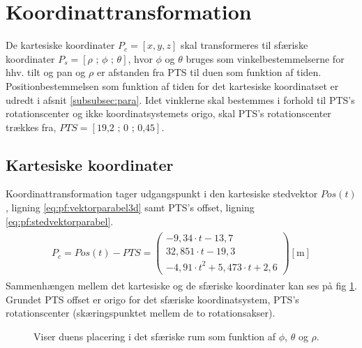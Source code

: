 \section{Koordinattransformation}
\label{sec:koordinattransformation}

De kartesiske koordinater \(P_c=[x, y, z]\) skal transformeres til sfæriske koordinater \(P_s=[\rho \text{ ; } \phi \text{ ; } \theta]\), hvor \(\phi\) og \(\theta\) bruges som vinkelbestemmelserne for hhv. tilt og pan og \(\rho\) er afstanden fra PTS til duen som funktion af tiden.
Positionbestemmelsen som funktion af tiden for det kartesiske koordinatset er udredt i afsnit \ref{subsubsec:para}.
Idet vinklerne skal bestemmes i forhold til PTS's rotationscenter og ikke koordinatsystemets origo, skal PTS's rotationscenter trækkes fra, \(PTS=[\text{19,2 ; 0 ; 0,45}]\). 

\subsection{Kartesiske koordinater}
Koordinattransformation tager udgangspunkt i den kartesiske stedvektor \(Pos(t) \), ligning \ref{eq:pf:vektorparabel3d} samt PTS's offset, ligning \ref{eq:pf:stedvektorparabel}.
\begin{align}
\begin{split}
{ P }_{ c }=Pos\left( t \right) -PTS = \left( \begin{matrix} - 9,34\cdot t-13,7 \\32,851\cdot t-19,3
\\-{ 4,91\cdot t }^{ 2 }+5,473\cdot t+2,6\end{matrix} \right) [\text{m}]
\label{eq:pf:stedvektorparabel}
\end{split}
\end{align}
Sammenhængen mellem det kartesiske og de sfæriske koordinater kan ses på fig \ref{fig:thetaphi_degree}. 
Grundet PTS offset er origo for det sfæriske koordinatsystem, PTS's rotationscenter (skæringspunktet mellem de to rotationsakser).

\begin{figure}[!th]
\centering
\begin{tikzpicture}[scale=4]

\end{tikzpicture}
\caption[Sfærisk koordinatsystem til koordinattransformation]{Viser duens placering i det sfæriske rum som funktion af  \(\phi\), \(\theta\) og \(\rho\).}
\label{fig:thetaphi_degree}
\end{figure}

